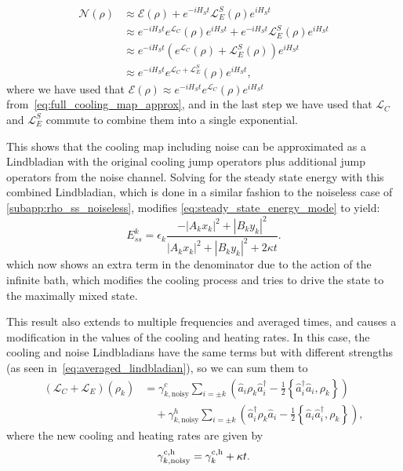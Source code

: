 \begin{align}
    \mathcal{N}(\rho) &\approx \mathcal{E}(\rho) + e^{-iH_{S}t}\mathcal{L}_E^S(\rho)e^{i H_{S}t}\nonumber\\
                      &\approx e^{-iH_{S}t}e^{\mathcal{L}_C}(\rho)e^{i H_{S}t} + e^{-iH_{S}t}\mathcal{L}_E^S(\rho)e^{i H_{S}t}\nonumber\\
                      &\approx e^{-iH_{S}t}(e^{\mathcal{L}_C}(\rho) + \mathcal{L}_E^S(\rho))e^{i H_{S}t}\nonumber\\
                      &\approx e^{-iH_{S}t}e^{\mathcal{L}_C+\mathcal{L}_E^S}(\rho)e^{i H_{S}t},
\end{align}
where we have used that $\mathcal{E}(\rho) \approx e^{-iH_{S}t}e^{\mathcal{L}_C}(\rho)e^{i H_{S}t}$ from~\cref{eq:full_cooling_map_approx}, and in the last step we have used that $\mathcal{L}_C$ and $\mathcal{L}_E^S$ commute to combine them into a single exponential.

This shows that the cooling map including noise can be approximated as a Lindbladian with the original cooling jump operators plus additional jump operators from the noise channel. Solving for the steady state energy with this combined Lindbladian, which is done in a similar fashion to the noiseless case of \cref{subapp:rho_ss_noiseless}, modifies \cref{eq:steady_state_energy_mode} to yield:
\begin{equation}
    E_{ss}^k= \epsilon_k\frac{-|A_k x_k|^2+|B_k y_k|^2}{|A_k x_k|^2+|B_k y_k|^2+2\kappa t}.
    \label{eq:steady_state_energy_mode_noisy}
\end{equation}
which now shows an extra term in the denominator due to the action of the infinite bath, which modifies the cooling process and tries to drive the state to the maximally mixed state.

This result also extends to multiple frequencies and averaged times, and causes a modification in the values of the cooling and heating rates. In this case, the cooling and noise Lindbladians have the same terms but with different strengths (as seen in~\cref{eq:averaged_lindbladian}), so we can sum them to
\begin{align}
    (\mathcal{L}_C+\mathcal{L}_E)(\rho_k) &= \gamma_{k,\text{noisy}}^c \sum_{i=\pm k} \left( \hat{a}_i \rho_k \hat{a}_i^\dag - \frac{1}{2} \left\{ \hat{a}_i^\dag \hat{a}_i, \rho_k \right\} \right)        \nonumber\\
                                          &\quad + \gamma_{k,\text{noisy}}^h \sum_{i=\pm k} \left( \hat{a}_i^\dag \rho_k \hat{a}_i - \frac{1}{2} \left\{ \hat{a}_i \hat{a}_i^\dag, \rho_k \right\} \right),
\end{align}
where the new cooling and heating rates are given by
\begin{equation}
    \gamma_{k, \text{noisy}}^{\rm c,h}=\gamma_{k}^{\rm c,h}+\kappa t.
\end{equation}



